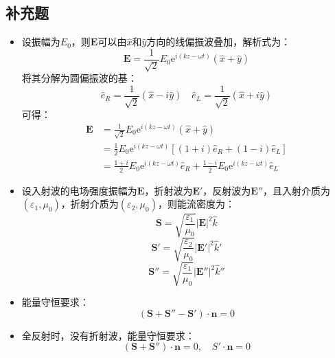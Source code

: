 \documentclass[a4paper,fontset=none]{ctexart}
\begin{document}
    \subsection*{补充题}

    \begin{itemize}

        \item[1.]
        设振幅为$E_0$，则$\bm{E}$可以由$\hat{x}$和$\hat{y}$方向的线偏振波叠加，解析式为：
        \[
            \bm{E} = \frac{1}{\sqrt{2}}E_0\mathrm{e}^{i(kz-\omega t)}(\hat{x}+\hat{y})
        \]
        将其分解为圆偏振波的基：
        \[
            \hat{e}_R = \frac{1}{\sqrt{2}}(\hat{x} - i\hat{y})\quad \hat{e}_L = \frac{1}{\sqrt{2}}(\hat{x} + i\hat{y})
        \]
        可得：
        \begin{align*}
            \bm{E}
            &= \frac{1}{\sqrt{2}}E_0\mathrm{e}^{i(kz-\omega t)}(\hat{x}+\hat{y}) \\
            &= \frac{1}{2}E_0\mathrm{e}^{i(kz-\omega t)}[(1+i)\hat{e}_R + (1-i)\hat{e}_L] \\
            &= \frac{1+i}{2}E_0\mathrm{e}^{i(kz-\omega t)}\hat{e}_R + \frac{1-i}{2}E_0\mathrm{e}^{i(kz-\omega t)}\hat{e}_L
        \end{align*}

        \item[2.(1)]
        设入射波的电场强度振幅为$\bm{E}$，折射波为$\bm{E}'$，反射波为$\bm{E}''$，且入射介质为$(\varepsilon_1,\mu_0)$，折射介质为$(\varepsilon_2,\mu_0)$，则能流密度为：
        \[
            \bm{S} = \sqrt{\frac{\varepsilon_1}{\mu_0}}|\bm{E}|^2\hat{k}
        \]
        \[
            \bm{S}' = \sqrt{\frac{\varepsilon_2}{\mu_0}}|\bm{E'}|^2\hat{k}'
        \]
        \[
            \bm{S}'' = \sqrt{\frac{\varepsilon_1}{\mu_0}}|\bm{E''}|^2\hat{k}''
        \]

        \item[2.(2)]
        能量守恒要求：
        \[
            (\bm{S} + \bm{S}'' - \bm{S}') \cdot \bm{n} = 0
        \]

        \item[2.(3)]
        全反射时，没有折射波，能量守恒要求：
        \[
            (\bm{S} + \bm{S}'') \cdot \bm{n} = 0,\quad S' \cdot \bm{n} = 0
        \]

    \end{itemize}
\end{document}

